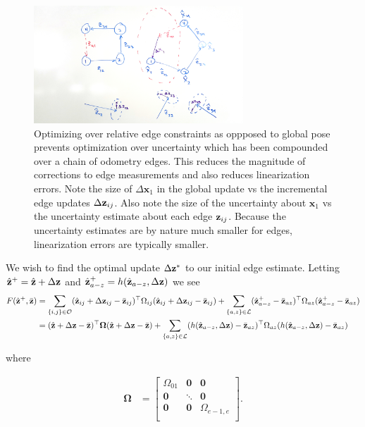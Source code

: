 \begin{figure}
  \includegraphics[width=0.7\textwidth]{figures/linearization.jpg}
  \caption{Optimizing over relative edge constraints as oppposed to global pose prevents optimization over uncertainty which has been compounded over a chain of odometry edges.  This reduces the magnitude of corrections to edge measurements and also reduces linearization errors.  Note the size of $\Delta\textbf{x}_1$ in the global update vs the incremental edge updates $\Delta \mathbf{z}_{ij}$.  Also note the size of the uncertainty about $\textbf{x}_1$ vs the uncertainty estimate about each edge $\mathbf{z}_{ij}$.  Because the uncertainty estimates are by nature much smaller for edges, linearization errors are typically smaller.}
  \label{fig:linearization}
\end{figure}

We wish to find the optimal update $\Delta\mathbf{z}^*$ to our initial edge estimate. Letting $\hat{\mathbf{z}}^+ = \hat{\mathbf{z}} + \Delta\mathbf{z}$ and $\hat{\mathbf{z}}_{a-z}^+ = h(\hat{\mathbf{z}}_{a-z},\Delta\mathbf{z})$ we see
\begin{align*}
  F(\hat{\mathbf{z}}^+,\bar{\mathbf{z}}) &= \sum_{\{i,j\} \in \mathcal{O}} (\hat{\mathbf{z}}_{ij} + \Delta\mathbf{z}_{ij}-\bar{\mathbf{z}}_{ij})^\top\Omega_{ij}(\hat{\mathbf{z}}_{ij} + \Delta\mathbf{z}_{ij}-\bar{\mathbf{z}}_{ij}) + \sum_{\{a,z\} \in \mathcal{L}} (\hat{\mathbf{z}}_{a-z}^+-\bar{\mathbf{z}}_{az})^\top\Omega_{az}(\hat{\mathbf{z}}_{a-z}^+-\bar{\mathbf{z}}_{az}) \\
  &= (\hat{\mathbf{z}}+\Delta\mathbf{z}-\bar{\mathbf{z}})^\top\boldsymbol{\Omega}(\hat{\mathbf{z}}+\Delta\mathbf{z}-\bar{\mathbf{z}}) + \sum_{\{a,z\} \in \mathcal{L}} (h(\hat{\mathbf{z}}_{a-z},\Delta\mathbf{z})-\bar{\mathbf{z}}_{az})^\top\Omega_{az}(h(\hat{\mathbf{z}}_{a-z},\Delta\mathbf{z})-\bar{\mathbf{z}}_{az})
\end{align*}

where

\begin{align*}
  \boldsymbol{\Omega} &= \left[\begin{array}{ccc}
  \Omega_{01} & \mathbf{0} & \mathbf{0} \\
  \mathbf{0}  & \ddots     & \mathbf{0} \\
  \mathbf{0}  & \mathbf{0} & \Omega_{e-1,e}\\
  \end{array}\right].
\end{align*}

